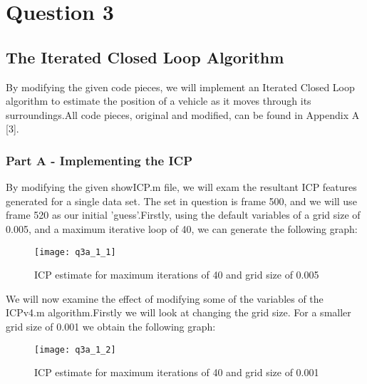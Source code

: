 \newpage
\section{Question 3}
	\subsection*{The Iterated Closed Loop Algorithm}
	\noindent
	\newline
	By modifying the given code pieces, we will implement an Iterated Closed Loop algorithm to estimate the position of a vehicle as it moves through its surroundings.\newline All code pieces, original and modified, can be found in Appendix A [3].
		\subsubsection{Part A - Implementing the ICP}
		\newline
		By modifying the given showICP.m file, we will exam the resultant ICP features generated for a single data set. The set in question is frame 500, and we will use frame 520 as our initial 'guess'.\newline Firstly, using the default variables of a grid size of 0.005, and a maximum iterative loop of 40, we can generate the following graph:\newline
			\begin{figure}[position = here]
				\begin{centering}
					\texttt{[image: q3a\_1\_1]}\\
					\caption[\textit{RPYAxes}]{ICP estimate for maximum iterations of 40 and grid size of 0.005}
				\end{centering}
			\end{figure}
		\newline
		We will now examine the effect of modifying some of the variables of the ICPv4.m algorithm.\newline Firstly we will look at changing the grid size. For a smaller grid size of 0.001 we obtain the following graph:\newline
		
			\begin{figure}[position = here]
				\begin{centering}
					\texttt{[image: q3a\_1\_2]}\\
					\caption[\textit{RPYAxes}]{ICP estimate for maximum iterations of 40 and grid size of 0.001}
				\end{centering}
			\end{figure}
			

